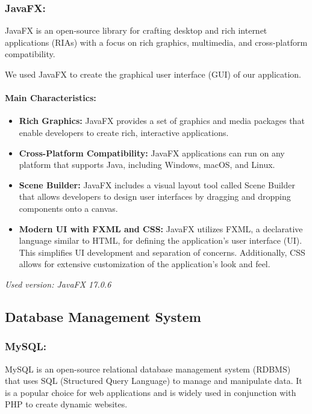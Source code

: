\documentclass{article}
\begin{document}
\subsubsection*{JavaFX:}
JavaFX is an open-source library for crafting desktop and rich internet applications (RIAs) with a focus on rich graphics, multimedia, and cross-platform compatibility.

We used JavaFX to create the graphical user interface (GUI) of our application.

\paragraph*{Main Characteristics:}

\begin{itemize}
    \item \textbf{Rich Graphics:} JavaFX provides a set of graphics and media packages that enable developers to create rich, interactive applications.
    \item \textbf{Cross-Platform Compatibility:} JavaFX applications can run on any platform that supports Java, including Windows, macOS, and Linux.
    \item \textbf{Scene Builder:} JavaFX includes a visual layout tool called Scene Builder that allows developers to design user interfaces by dragging and dropping components onto a canvas.
    \item \textbf{Modern UI with FXML and CSS:} JavaFX utilizes FXML, a declarative language similar to HTML, for defining the application's user interface (UI). This simplifies UI development and separation of concerns. Additionally, CSS allows for extensive customization of the application's look and feel.
\end{itemize}

\textit{Used version: JavaFX 17.0.6}

\subsection[Database Management System]{Database Management System}

\subsubsection*{MySQL:}

MySQL is an open-source relational database management system (RDBMS) that uses SQL (Structured Query Language) to manage and manipulate data. It is a popular choice for web applications and is widely used in conjunction with PHP to create dynamic websites.
\end{document}
